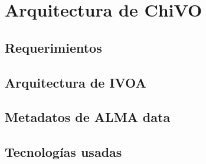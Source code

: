 \section{Arquitectura de ChiVO}
\subsection{Requerimientos}
\subsection{Arquitectura de IVOA}
\subsection{Metadatos de ALMA data}
\subsection{Tecnologías usadas}
